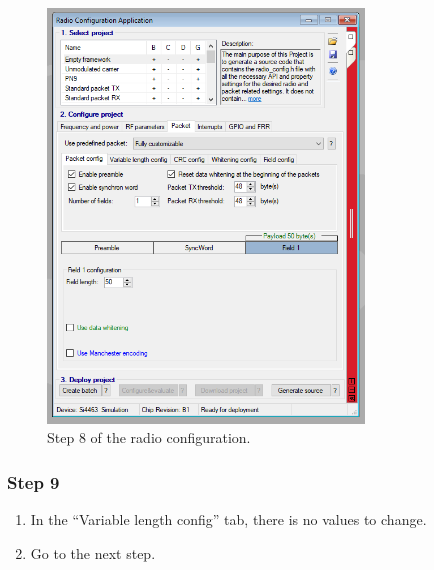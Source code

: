 \begin{figure}[!h]
	\begin{center}
		\includegraphics[width=0.75\textwidth]{figures/wds-tutorial/wds-tutorial-8.png}
		\caption{Step 8 of the radio configuration.}
		\label{fig:wds-tutorial-step-8}
	\end{center}
\end{figure}

\subsubsection{Step 9}

\begin{enumerate}
    \item In the ``Variable length config'' tab, there is no values to change.
    \item Go to the next step.
\end{enumerate}

